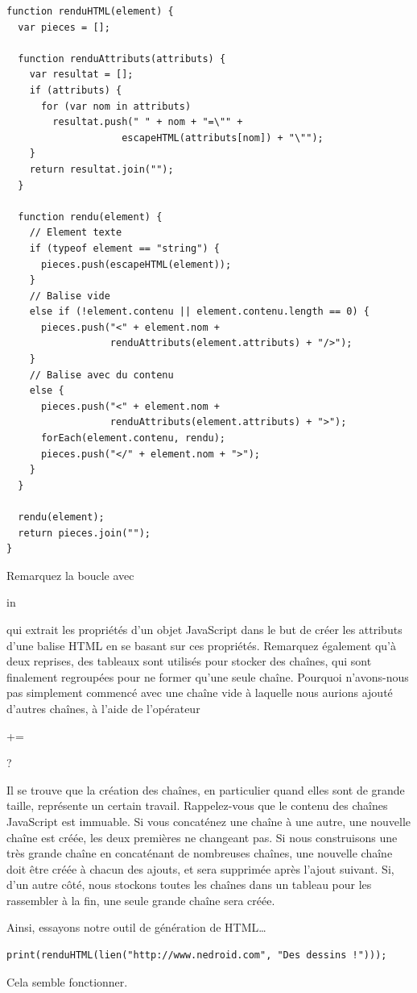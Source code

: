 \documentclass{FramateX}
\renewcommand{\texttt}[1]{\begin{sffamily}{#1}\end{sffamily}}
\begin{document}
\begin{lstlisting}
function renduHTML(element) {
  var pieces = [];

  function renduAttributs(attributs) {
    var resultat = [];
    if (attributs) {
      for (var nom in attributs)
        resultat.push(" " + nom + "=\"" +
                    escapeHTML(attributs[nom]) + "\"");
    }
    return resultat.join("");
  }

  function rendu(element) {
    // Element texte
    if (typeof element == "string") {
      pieces.push(escapeHTML(element));
    }
    // Balise vide
    else if (!element.contenu || element.contenu.length == 0) {
      pieces.push("<" + element.nom +
                  renduAttributs(element.attributs) + "/>");
    }
    // Balise avec du contenu
    else {
      pieces.push("<" + element.nom +
                  renduAttributs(element.attributs) + ">");
      forEach(element.contenu, rendu);
      pieces.push("</" + element.nom + ">");
    }
  }

  rendu(element);
  return pieces.join("");
}
\end{lstlisting}
Remarquez la boucle avec \texttt{in} qui extrait les propriétés d'un
objet JavaScript dans le but de créer les attributs d'une balise HTML en
se basant sur ces propriétés. Remarquez également qu'à deux reprises,
des tableaux sont utilisés pour stocker des chaînes, qui sont finalement
regroupées pour ne former qu'une seule chaîne. Pourquoi n'avons-nous pas
simplement commencé avec une chaîne vide à laquelle nous aurions ajouté
d'autres chaînes, à l'aide de l'opérateur \texttt{+=} ?

Il se trouve que la création des chaînes, en particulier quand elles
sont de grande taille, représente un certain travail. Rappelez-vous que
le contenu des chaînes JavaScript est immuable. Si vous concaténez une
chaîne à une autre, une nouvelle chaîne est créée, les deux premières ne
changeant pas. Si nous construisons une très grande chaîne en
concaténant de nombreuses chaînes, une nouvelle chaîne doit être créée à
chacun des ajouts, et sera supprimée après l'ajout suivant. Si, d'un
autre côté, nous stockons toutes les chaînes dans un tableau pour les
rassembler à la fin, une seule grande chaîne sera créée.

\begin{center}\end{center}

Ainsi, essayons notre outil de génération de HTML\ldots{}

\begin{lstlisting}
print(renduHTML(lien("http://www.nedroid.com", "Des dessins !")));
\end{lstlisting}
Cela semble fonctionner.
\end{document}
